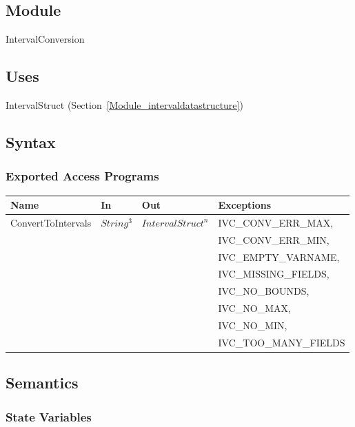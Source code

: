 \documentclass[12pt, titlepage]{article}
\begin{document}
\subsection{Module}

IntervalConversion

\subsection{Uses}

IntervalStruct (Section~\ref{Module_intervaldatastructure})

\subsection{Syntax}

\subsubsection{Exported Access Programs}

\begin{center}
	\begin{tabular}{p{3.3cm} p{2cm} p{3cm} p{5cm}}
		\hline
		\textbf{Name} & \textbf{In} & \textbf{Out} & \textbf{Exceptions} \\
		\hline
		\multirow{8}{3cm}{ConvertToIntervals} & \multirow{8}{2.3cm}{$String^3$} 
		& \multirow{8}{3cm}{$IntervalStruct^n$} & IVC\_CONV\_ERR\_MAX, \\
		& & & IVC\_CONV\_ERR\_MIN, \\
		& & & IVC\_EMPTY\_VARNAME, \\
		& & & IVC\_MISSING\_FIELDS, \\
		& & & IVC\_NO\_BOUNDS, \\
		& & & IVC\_NO\_MAX, \\
		& & & IVC\_NO\_MIN, \\
		& & & IVC\_TOO\_MANY\_FIELDS \\
		\hline
	\end{tabular}
\end{center}

\subsection{Semantics}

\subsubsection{State Variables}
\end{document}

